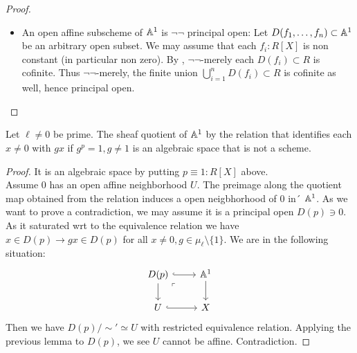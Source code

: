 \begin{proof}
	\begin{itemize}
		\item An open affine subscheme of $\mathbb{A}^1$ is $\lnot \lnot$ principal open: Let $D(f_1,\hdots,f_n) \subset \mathbb{A}^1$ be an arbitrary open subset. We may assume that each $f_i : R[X]$ is non constant (in particular non zero). By \todocite, $\lnot \lnot$-merely each $D(f_i) \subset R$ is cofinite. Thus $\lnot \lnot$-merely, the finite union $\bigcup_{i=1}^n D(f_i) \subset R$ is cofinite as well, hence principal open. %
	\end{itemize}
\end{proof}
\begin{prop}
	Let $\ell \neq 0$ be prime. The sheaf quotient of $\mathbb{A}^1$ by the relation that identifies each  $x \neq 0$ with $g x$ if $g^p = 1, g \neq 1$ is an algebraic space that is not a scheme.
\end{prop}
\begin{proof}
	It is an algebraic space by putting $p \equiv 1 : R[X]$ above. \\
	Assume $0$ has an open affine neighborhood $U$. The preimage along the quotient map obtained from the relation induces a open neigbhorhood of $0$ in´ $\mathbb{A}^1$. As we want to prove a contradiction, we may assume it is a principal open $D(p) \ni 0$. As it saturated wrt to the equivalence relation we have $x \in D(p) \to g x \in D(p)$ for all $x \neq 0, g \in \mu_\ell \setminus \{1\}$. We are in the following situation:
	\[\begin{tikzcd}
		{D(p)} & {\bA^1} \\
		U & X
		\arrow[hook, from=1-1, to=1-2]
		\arrow[from=1-1, to=2-1]
		\arrow["\ulcorner"{anchor=center, pos=0.125}, draw=none, from=1-1, to=2-2]
		\arrow[from=1-2, to=2-2]
		\arrow[hook, from=2-1, to=2-2]
	\end{tikzcd}\]
	Then we have $D(p) / \sim' \simeq U$ with restricted equivalence relation. Applying the previous lemma to $D(p)$, we see $U$ cannot be affine. Contradiction.
\end{proof}
